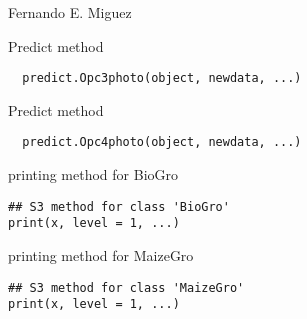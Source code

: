 \documentclass[letterpaper]{book}
\begin{document}
%
\begin{Author}\relax
Fernando E. Miguez
\end{Author}
%
\begin{Description}\relax
Predict method
\end{Description}
%
\begin{Usage}
\begin{verbatim}
  predict.Opc3photo(object, newdata, ...)
\end{verbatim}
\end{Usage}
%
\begin{Description}\relax
Predict method
\end{Description}
%
\begin{Usage}
\begin{verbatim}
  predict.Opc4photo(object, newdata, ...)
\end{verbatim}
\end{Usage}
%
\begin{Description}\relax
printing method for BioGro
\end{Description}
%
\begin{Usage}
\begin{verbatim}
## S3 method for class 'BioGro'
print(x, level = 1, ...)
\end{verbatim}
\end{Usage}
%
\begin{Arguments}
\begin{ldescription}
\item[\code{x}] 
\end{ldescription}
\end{Arguments}
%
\begin{Description}\relax
printing method for MaizeGro
\end{Description}
%
\begin{Usage}
\begin{verbatim}
## S3 method for class 'MaizeGro'
print(x, level = 1, ...)
\end{verbatim}
\end{Usage}
%
\begin{Arguments}
\begin{ldescription}
\item[\code{x}] 
\end{ldescription}
\end{Arguments}
\end{document}

